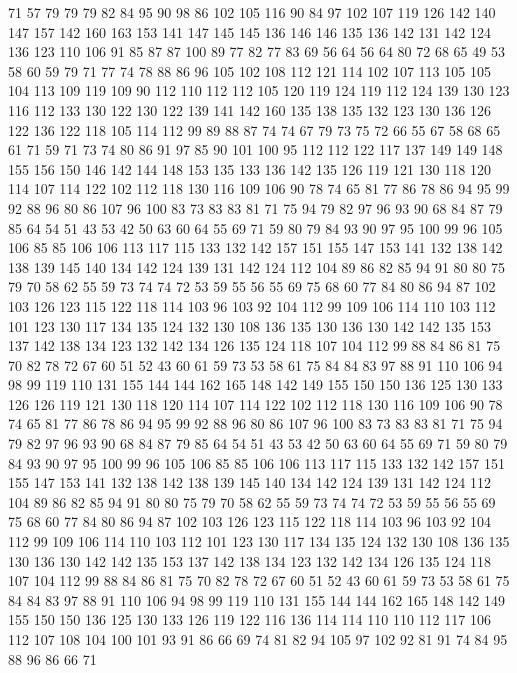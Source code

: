 71 57 79 79 79 82 84 95 90 98 86 102 105 116 90 84 97 102 107 119
126 142 140 147 157 142 160 163 153 141 147 145 145 136 146 146 135 136 142 131
142 124 136 123 110 106 91 85 87 87 100 89 77 82 77 83 69 56 64 56
64 80 72 68 65 49 53 58 60 59 79 71 77 74 78 88 86 96 105 102
108 112 121 114 102 107 113 105 105 104 113 109 119 109 90 112 110 112 112 105
120 119 124 119 112 124 139 130 123 116 112 133 130 122 130 122 139 141 142 160
135 138 135 132 123 130 136 126 122 136 122 118 105 114 112 99 89 88 87 74
74 67 79 73 75 72 66 55 67 58 68 65 61 71 59 71 73 74 80 86
91 97 85 90 101 100 95 112 112 122 117 137 149 149 148 155 156 150 146 142
144 148 153 135 133 136 142 135 126 119 121 130 118 120 114 107 114 122 102 112
118 130 116 109 106 90 78 74 65 81 77 86 78 86 94 95 99 92 88 96
80 86 107 96 100 83 73 83 83 81 71 75 94 79 82 97 96 93 90 68
84 87 79 85 64 54 51 43 53 42 50 63 60 64 55 69 71 59 80 79
84 93 90 97 95 100 99 96 105 106 85 85 106 106 113 117 115 133 132 142
157 151 155 147 153 141 132 138 142 138 139 145 140 134 142 124 139 131 142 124
112 104 89 86 82 85 94 91 80 80 75 79 70 58 62 55 59 73 74 74
72 53 59 55 56 55 69 75 68 60 77 84 80 86 94 87 102 103 126 123
115 122 118 114 103 96 103 92 104 112 99 109 106 114 110 103 112 101 123 130
117 134 135 124 132 130 108 136 135 130 136 130 142 142 135 153 137 142 138 134
123 132 142 134 126 135 124 118 107 104 112 99 88 84 86 81 75 70 82 78
72 67 60 51 52 43 60 61 59 73 53 58 61 75 84 84 83 97 88 91
110 106 94 98 99 119 110 131 155 144 144 162 165 148 142 149 155 150 150 136
125 130 133 126 126 119 121 130 118 120 114 107 114 122 102 112 118 130 116 109
106 90 78 74 65 81 77 86 78 86 94 95 99 92 88 96 80 86 107 96
100 83 73 83 83 81 71 75 94 79 82 97 96 93 90 68 84 87 79 85
64 54 51 43 53 42 50 63 60 64 55 69 71 59 80 79 84 93 90 97
95 100 99 96 105 106 85 85 106 106 113 117 115 133 132 142 157 151 155 147
153 141 132 138 142 138 139 145 140 134 142 124 139 131 142 124 112 104 89 86
82 85 94 91 80 80 75 79 70 58 62 55 59 73 74 74 72 53 59 55
56 55 69 75 68 60 77 84 80 86 94 87 102 103 126 123 115 122 118 114
103 96 103 92 104 112 99 109 106 114 110 103 112 101 123 130 117 134 135 124
132 130 108 136 135 130 136 130 142 142 135 153 137 142 138 134 123 132 142 134
126 135 124 118 107 104 112 99 88 84 86 81 75 70 82 78 72 67 60 51
52 43 60 61 59 73 53 58 61 75 84 84 83 97 88 91 110 106 94 98
99 119 110 131 155 144 144 162 165 148 142 149 155 150 150 136 125 130 133 126
119 122 116 136 114 114 110 110 112 117 106 112 107 108 104 100 101 93 91 86
66 69 74 81 82 94 105 97 102 92 81 91 74 84 95 88 96 86 66 71
